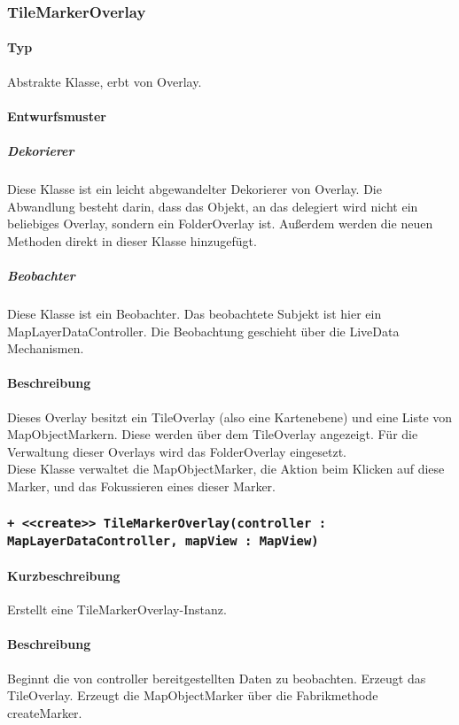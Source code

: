 \subsubsection{TileMarkerOverlay}\label{App_Map_View_TileMarkerOverlay}
\paragraph*{Typ} 
Abstrakte Klasse, erbt von Overlay.
\paragraph*{Entwurfsmuster}
\subparagraph*{Dekorierer}
Diese Klasse ist ein leicht abgewandelter Dekorierer von Overlay.
Die Abwandlung besteht darin, dass das Objekt, an das delegiert wird nicht ein
beliebiges Overlay, sondern ein FolderOverlay ist. Außerdem werden die neuen 
Methoden direkt in dieser Klasse hinzugefügt.\\
\subparagraph*{Beobachter}
Diese Klasse ist ein Beobachter. Das beobachtete Subjekt ist hier ein MapLayerDataController.
Die Beobachtung geschieht über die LiveData Mechanismen.
\paragraph*{Beschreibung}
Dieses Overlay besitzt ein TileOverlay (also eine Kartenebene) und eine 
Liste von MapObjectMarkern. Diese werden über dem TileOverlay angezeigt.
Für die Verwaltung dieser Overlays wird das FolderOverlay eingesetzt.\\
Diese Klasse verwaltet die MapObjectMarker, die Aktion beim Klicken auf diese Marker, 
und das Fokussieren eines dieser Marker.

\subsubsection*{\texttt{+ <<create>> TileMarkerOverlay(controller : MapLayerDataController, mapView : MapView)}}%
\paragraph*{Kurzbeschreibung}
Erstellt eine TileMarkerOverlay-Instanz.
\paragraph*{Beschreibung}
Beginnt die von controller bereitgestellten Daten zu beobachten. Erzeugt das TileOverlay.
Erzeugt die MapObjectMarker über die Fabrikmethode createMarker.
